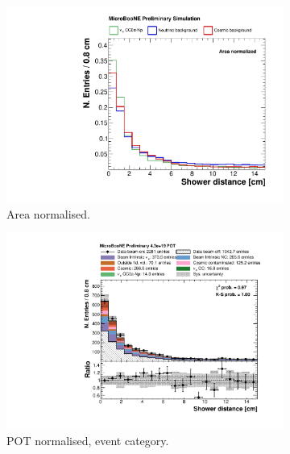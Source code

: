 \begin{figure}[htbp]
\centering
  \begin{subfigure}{0.49\textwidth}
    \includegraphics[width=\linewidth]{figures/h_shower_distance_norm.pdf}
    \caption{Area normalised.} \label{fig:showerd_norm}
  \end{subfigure}
    \begin{subfigure}{0.49\textwidth}
    \includegraphics[width=\linewidth]{figures/h_shower_distance.pdf}
    \caption{POT normalised, event category.} \label{fig:showerd_pot}
  \end{subfigure}
  \begin{subfigure}{0.49\textwidth}

\end{subfigure}
\end{figure}
